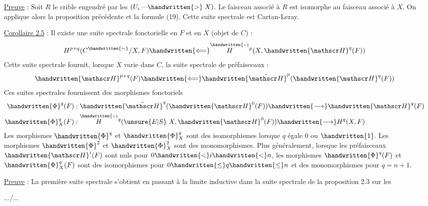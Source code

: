 \uline{Preuve} : Soit $R$ le crible engendré par les $(U_i\mathrel{\text{---}\!\handwritten{>}}X)$. Le faisceau associé à $R$ est isomorphe au faisceau associé à $X$. On applique alors la proposition précédente et la formule (19).
Cette suite spectrale est   Cartan-Leray.

\uline{Corollaire 2.5} : Il existe une suite spectrale fonctorielle en $F$ et en $X$ (objet de $C$) :
\[
 H^{p+q}(C^{\handwritten{\sim}}/X,F)\handwritten{\Longleftarrow}
 \overset{\handwritten{\scriptscriptstyle\vee}}{H}{}^p(X,\handwritten{\mathscr H}^q(F))
\]
Cette suite spectrale fournit, lorsque $X$ varie dans $C$, la suite spectrale de préfaisceaux :
\[
 \handwritten{\mathscr H}^{p+q}(F)\handwritten{\Longleftarrow}
 \handwritten{\check{\mathscr H}}^p(\handwritten{\mathscr H}^q(F))
\]
Ces suites spectrales fournissent des morphismes fonctoriels \handwritten{:}
\margin{\handwritten{$\unsure{\checkmark}$}}
\[
\begin{aligned}
\handwritten{\Phi}^q(F)&:\handwritten{\check{\mathscr H}}^q(\handwritten{\mathscr H}^0(F))\handwritten{\longrightarrow}\handwritten{\mathscr H}^q(F)\\
\handwritten{\Phi}^q_X(F)&:\overset{\handwritten{\scriptscriptstyle\vee}}{H}{}^q(\unsure{E|S}\ X,\handwritten{\mathscr H}^0(F))\handwritten{\longrightarrow}H^q(X,F)
\end{aligned}
\]
Les morphismes $\handwritten{\Phi}^q$ et $\handwritten{\Phi}^q_X$ sont des isomorphismes lorsque $q$ égale $0$ ou $\handwritten{1}$. Les morphismes $\handwritten{\Phi}^2$ et $\handwritten{\Phi}^2_X$ sont des monomorphismes. Plus généralement, lorsque les préfaisceaux $\handwritten{\mathscr H}^i(F)$ sont nuls pour $0\handwritten{<}i\handwritten{<}n$, les morphismes $\handwritten{\Phi}^q(F)$ et $\handwritten{\Phi}^q_X(F)$ sont des isomorphismes pour $0\handwritten{\leq}q\handwritten{\leq}n$ et des monomorphismes pour $q=n+1$.

\uline{Preuve} : La première suite spectrale s'obtient en passant à la limite inductive dans la suite spectrale de la proposition 2.3 sur les

\hfill .../...

